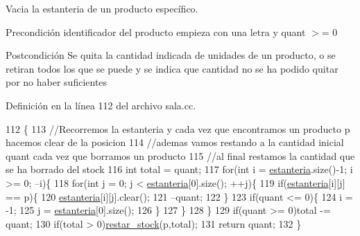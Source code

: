 Vacia la estanteria de un producto específico. 

\begin{DoxyPrecond}{Precondición}
identificador del producto empieza con una letra y quant $>$= 0 
\end{DoxyPrecond}
\begin{DoxyPostcond}{Postcondición}
Se quita la cantidad indicada de unidades de un producto, o se retiran todos los que se puede y se indica que cantidad no se ha podido quitar por no haber suficientes 
\end{DoxyPostcond}


Definición en la línea 112 del archivo sala.\+cc.


\begin{DoxyCode}
112                                           \{
113     \textcolor{comment}{//Recorremos la estanteria y cada vez que encontramos un producto p hacemos clear de la posicion}
114     \textcolor{comment}{//ademas vamos restando a la cantidad inicial quant cada vez que borramos un producto}
115     \textcolor{comment}{//al final restamos la cantidad que se ha borrado del stock }
116     \textcolor{keywordtype}{int} total = quant;
117     \textcolor{keywordflow}{for}(\textcolor{keywordtype}{int} i = \mbox{\hyperlink{class_sala_a8f5264818c98db9c0d075c51a7672d95}{estanteria}}.size()-1; i >= 0; --i)\{
118         \textcolor{keywordflow}{for}(\textcolor{keywordtype}{int} j = 0; j < \mbox{\hyperlink{class_sala_a8f5264818c98db9c0d075c51a7672d95}{estanteria}}[0].size(); ++j)\{
119             \textcolor{keywordflow}{if}(\mbox{\hyperlink{class_sala_a8f5264818c98db9c0d075c51a7672d95}{estanteria}}[i][j] == p)\{
120                 \mbox{\hyperlink{class_sala_a8f5264818c98db9c0d075c51a7672d95}{estanteria}}[i][j].clear();
121                 --quant;
122             \}
123             \textcolor{keywordflow}{if}(quant <= 0)\{
124                 i = -1;
125                 j = \mbox{\hyperlink{class_sala_a8f5264818c98db9c0d075c51a7672d95}{estanteria}}[0].size();
126             \}  
127         \}
128     \}
129     \textcolor{keywordflow}{if}(quant >= 0)total -= quant;
130     \textcolor{keywordflow}{if}(total > 0)\mbox{\hyperlink{class_sala_a3f2485d40f7d90ca5eb8142dbadd5993}{restar\_stock}}(p,total);  
131     \textcolor{keywordflow}{return} quant;    
132 \}
\end{DoxyCode}
\mbox{\label{class_sala_a91e0acab4f56f3a5cbcad80afe163de8}} 
